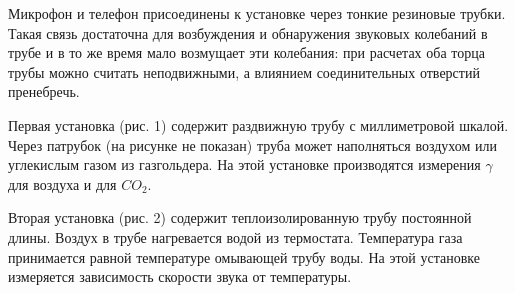 \documentclass[a4paper,12pt]{article}
\begin{document}
	Микрофон и телефон присоединены к установке через тонкие резиновые трубки. Такая связь достаточна для возбуждения и обнаружения звуковых колебаний в трубе и в то же время мало возмущает эти колебания: при расчетах оба торца трубы можно считать неподвижными, а влиянием соединительных отверстий пренебречь.

	Первая установка (рис. 1) содержит раздвижную трубу с миллиметровой шкалой. Через патрубок (на рисунке не показан) труба может наполняться воздухом или углекислым газом из газгольдера. На этой установке производятся измерения $\gamma$ для воздуха и для $CO_2$.
	
	Вторая установка (рис. 2) содержит теплоизолированную трубу постоянной длины. Воздух в трубе нагревается водой из термостата. Температура газа принимается равной температуре омывающей трубу воды. На этой установке измеряется зависимость скорости звука от температуры.
\end{document}

